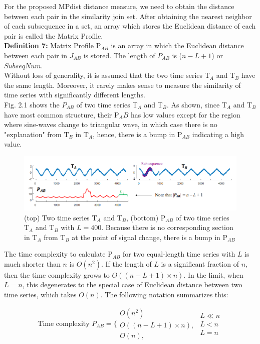 For the proposed MPdist distance measure, we need to obtain the distance between each pair in the similarity join set. After obtaining the nearest neighbor of each subsequence in a set, an array which stores the Euclidean distance of each pair is called the Matrix Profile.\\
\textbf{Definition 7:} Matrix Profile P$_{AB}$ is an array in which the Euclidean distance between each pair in $J_{AB}$ is stored. The length of $P_{AB}$ is ($n - L + 1$) or $SubseqNum$. \\
Without loss of generality, it is assumed that the two time series T$_A$ and T$_B$ have the same length. Moreover, it rarely makes sense to measure the similarity of time series with significantly different lengths.\\
Fig. 2.1 shows the $P_{AB}$ of two time series T$_A$ and T$_B$. As shown, since T$_A$ and T$_B$ have most common structure, their P$_AB$ has low values except for the region where sine-waves change to triangular wave, in which case there is no "explanation" from T$_{B}$ in T$_{A}$, hence, there is a bump in P$_{AB}$ indicating a high value.

\begin{figure}
\centering     
\includegraphics[width=1\textwidth]{Figures/MPdist_fig3.png}
\caption{(top) Two time series T$_A$ and T$_B$, (bottom) P$_{AB}$ of two time series T$_A$ and T$_B$ with $L = 400$. Because there is no corresponding section in T$_A$ from T$_B$ at the point of signal change, there is a bump in P$_{AB}$}
\label{fig:MPdist}
\end{figure} 

The time complexity to calculate P$_{AB}$ for two equal-length time series with $L$ is much shorter than $n$ is $O(n^2)$. If the length of $L$ is a significant fraction of $n$, then the time complexity grows to $O((n - L + 1) \times n)$. In the limit, when $L = n$, this degenerates to the special case of Euclidean distance between two time series, which takes $O(n)$. The following notation summarizes this:

\begin{equation}
\textrm{Time complexity } P_{AB} = \Bigg\{ \substack{
O(n^2)\ \\
O((n - L + 1) \times n), \\
O(n),
}
\substack{
L \ll n \\
L < n \\
L = n}
\end{equation}

